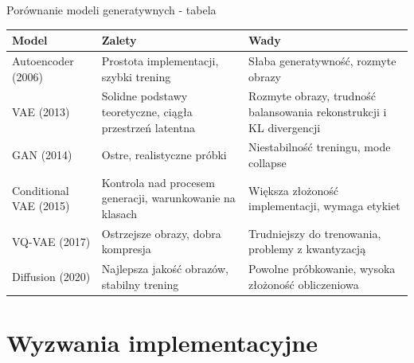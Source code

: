 \documentclass{beamer}
\begin{document}
\begin{frame}{Porównanie modeli generatywnych - tabela}
    \begin{tabular}{|p{2.5cm}|p{3.5cm}|p{3.5cm}|}
        \hline
        \textbf{Model}         & \textbf{Zalety}                                          & \textbf{Wady}                                                        \\
        \hline
        Autoencoder (2006)     & Prostota implementacji, szybki trening                   & Słaba generatywność, rozmyte obrazy                                  \\
        \hline
        VAE (2013)             & Solidne podstawy teoretyczne, ciągła przestrzeń latentna & Rozmyte obrazy, trudność balansowania rekonstrukcji i KL divergencji \\
        \hline
        GAN (2014)             & Ostre, realistyczne próbki                               & Niestabilność treningu, mode collapse                                \\
        \hline
        Conditional VAE (2015) & Kontrola nad procesem generacji, warunkowanie na klasach & Większa złożoność implementacji, wymaga etykiet                      \\
        \hline
        VQ-VAE (2017)          & Ostrzejsze obrazy, dobra kompresja                       & Trudniejszy do trenowania, problemy z kwantyzacją                    \\
        \hline
        Diffusion (2020)       & Najlepsza jakość obrazów, stabilny trening               & Powolne próbkowanie, wysoka złożoność obliczeniowa                   \\
        \hline
    \end{tabular}
\end{frame}


\section{Wyzwania implementacyjne}
\end{document}
